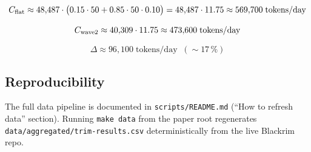 \begin{equation*}
  C_{\mathrm{flat}} \approx 48{,}487 \cdot
    \big( 0.15 \cdot 50 + 0.85 \cdot 50 \cdot 0.10 \big)
  = 48{,}487 \cdot 11.75 \approx 569{,}700\;\text{tokens/day}
\end{equation*}

\begin{equation*}
  C_{\mathrm{wave2}} \approx 40{,}309 \cdot 11.75 \approx 473{,}600\;\text{tokens/day}
\end{equation*}

\begin{equation*}
  \Delta \approx 96{,}100\;\text{tokens/day} \;\;(\sim 17\,\%)
\end{equation*}


\subsection{Reproducibility}
\label{sec:repro}

The full data pipeline is documented in \texttt{scripts/README.md}
(``How to refresh data'' section). Running \texttt{make data} from
the paper root regenerates \texttt{data/aggregated/trim-results.csv}
deterministically from the live Blackrim repo.
